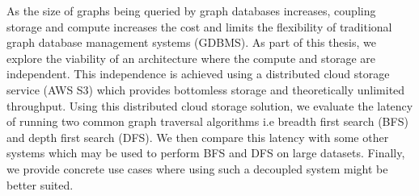 As the size of graphs being queried by graph databases increases, coupling 
storage and compute increases the cost and limits the flexibility of
traditional graph database management systems (GDBMS). As part of this thesis,
we explore the viability of an architecture where the compute and storage are
independent. This independence is achieved using a distributed cloud storage
service (AWS S3) which provides bottomless storage and theoretically unlimited
throughput. Using this distributed cloud storage solution, we evaluate the
latency of running two common graph traversal algorithms i.e breadth first
search (BFS) and depth first search (DFS). We then compare this latency with
some other systems which may be used to perform BFS and DFS on large datasets. 
Finally, we provide concrete use cases where using such a decoupled system might
be better suited. 
